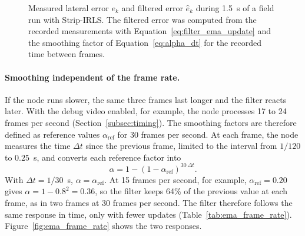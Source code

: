 \begin{figure}[H]
    \centering
    \caption{Measured lateral error $e_k$ and filtered error $\hat{e}_k$ during 1.5~s of a field run with Strip-IRLS. The filtered error was computed from the recorded measurements with Equation~\eqref{eq:filter_ema_update} and the smoothing factor of Equation~\eqref{eq:alpha_dt} for the recorded time between frames.}
    \label{fig:ema_field_example}
\end{figure}

\paragraph{Smoothing independent of the frame rate.}
If the node runs slower, the same three frames last longer and the filter reacts later. With the debug video enabled, for example, the node processes 17 to 24 frames per second (Section~\ref{subsec:timing}). The smoothing factors are therefore defined as reference values $\alpha_{\mathrm{ref}}$ for 30 frames per second. At each frame, the node measures the time $\Delta t$ since the previous frame, limited to the interval from $1/120$ to $0.25$~s, and converts each reference factor into
\begin{equation}
    \alpha = 1 - (1 - \alpha_{\mathrm{ref}})^{30\,\Delta t}.
    \label{eq:alpha_dt}
\end{equation}
With $\Delta t = 1/30$~s, $\alpha = \alpha_{\mathrm{ref}}$. At 15 frames per second, for example, $\alpha_{\mathrm{ref}} = 0.20$ gives $\alpha = 1 - 0.8^{2} = 0.36$, so the filter keeps 64\% of the previous value at each frame, as in two frames at 30 frames per second. The filter therefore follows the same response in time, only with fewer updates (Table~\ref{tab:ema_frame_rate}). Figure~\ref{fig:ema_frame_rate} shows the two responses.

